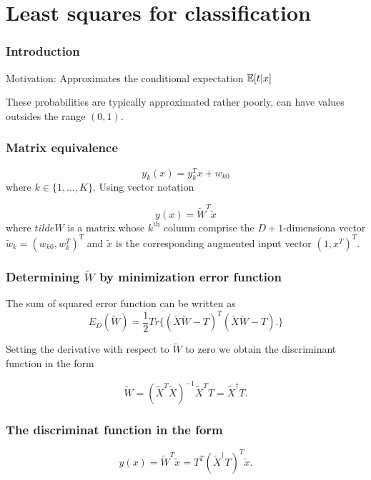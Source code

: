 \section{Least squares for classification}

\begin{frame}
    \frametitle{Introduction}
Motivation: Approximates the conditional expectation $\mathbb{E}[t|x]$
    
These probabilities are typically approximated rather poorly, can have values outsides the range
$(0,1)$. 
\end{frame}

\begin{frame}
    \frametitle{Matrix equivalence}

    \begin{equation}
        y_k(x) = 
        y^T_{k}x + w_{k 0}
    \end{equation}
    where $k \in \{1, \ldots, K\}.$
    Using vector notation

    \begin{equation}
        y(x)
        = 
        \tilde{W}^T \tilde{x}
    \end{equation}
    where $tilde{W}$ is a matrix whose $k^\text{th}$ column comprise the 
    $D+1$-dimensiona vector
    $\tilde{w}_k = (w_{k 0}, w^T_k)^T$
    and $\tilde{x}$ is the corresponding 
    augmented input vector $(1,x^T)^T$. 
\end{frame}

\begin{frame}
    \frametitle{Determining $\tilde{W}$ by minimization error function}

    The sum of squared error function can be written as 
    \begin{equation}
        E_D(\tilde{W})
        = 
        \frac{1}{2}
        Tr
        \{
            (\tilde{X} \tilde{W} - T)^T
            (\tilde{X} \tilde{W} - T).
        \}
    \end{equation}


    Setting the derivative with respect to 
    $\tilde W$ to zero we obtain the discriminant function in the form

    \begin{equation}
        \tilde W 
        = 
        (\tilde{X}^T\tilde{X})^{-1}
        \tilde{X}^T T 
        = 
        \tilde{X}^\dagger T.   
    \end{equation}
\end{frame}

\begin{frame}
    \frametitle{The discriminat function in the form}
    \begin{equation}
        y(x)
        =
        \tilde{W}^T \tilde{x}
        =
        T^T 
        \left(
            \tilde{X}^\dagger T 
        \right)^T
        \tilde{x}.
    \end{equation}
\end{frame}

